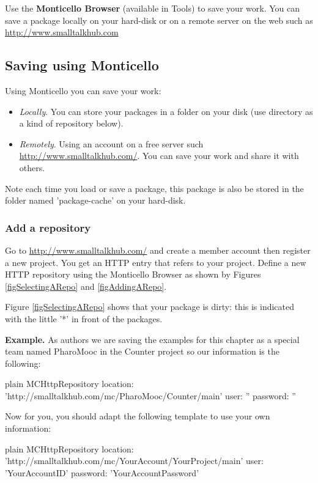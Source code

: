 \documentclass[10pt,twoside,english]{_support/latex/sbabook/sbabook}
\begin{document}
Use the \textbf{Monticello Browser} (available in Tools) to save your work. You can save a package locally on your hard-disk or on a remote server on the web such as \url{http://www.smalltalkhub.com}
\subsection{Saving using Monticello}
Using Monticello you can save your work:

\begin{itemize}
\item \textit{Locally}. You can store your packages in a folder on your disk (use directory as a kind of repository below).
\item \textit{Remotely}. Using an account on a free server such \url{http://www.smalltalkhub.com/}. You can save your work and share it with others.
\end{itemize}

Note each time you load or save a package, this package is also be stored in the folder named 'package-cache' on your hard-disk.
\subsubsection{Add a repository}
Go to \url{http://www.smalltalkhub.com/} and create a member account then register a new project. You get an HTTP entry that refers to your project. Define a new HTTP repository using the Monticello Browser as shown by Figures \ref{figSelectingARepo} and \ref{figAddingARepo}.

Figure \ref{figSelectingARepo} shows that your package is dirty: this is indicated with the little '*' in front of the packages.

\textbf{Example.} As authors we  are saving the examples for this chapter as a special team named PharoMooc in the Counter project so our information is the following:  

\begin{displaycode}{plain}
MCHttpRepository
	location: 'http://smalltalkhub.com/mc/PharoMooc/Counter/main'
	user: ''
	password: ''
\end{displaycode}

Now for you, you should adapt the following template to use your own information: 

\begin{displaycode}{plain}
MCHttpRepository
	location: 'http://smalltalkhub.com/mc/YourAccount/YourProject/main'
	user: 'YourAccountID'
	password: 'YourAccountPassword'
\end{displaycode}
\end{document}
